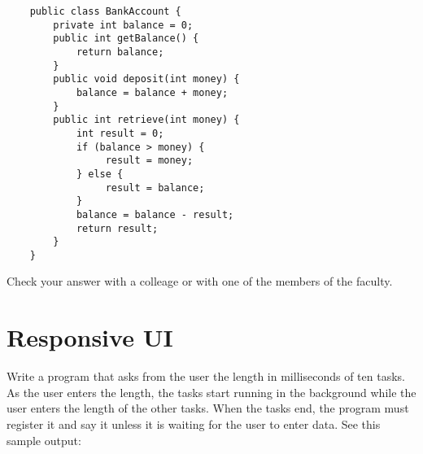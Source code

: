 \documentclass{article}
\begin{document}
\begin{verbatim}
    public class BankAccount {
        private int balance = 0;
        public int getBalance() {
            return balance;
        }
        public void deposit(int money) {
            balance = balance + money;
        }
        public int retrieve(int money) {
            int result = 0;
            if (balance > money) {
                 result = money;
            } else {
                 result = balance;
            }
            balance = balance - result;
            return result;
        }
    }
\end{verbatim}

Check your answer with a colleage or with one of the members of the
faculty. 




\section{Responsive UI}
\label{sec:responsive-ui}

Write a program that asks from the user the length in milliseconds of
ten tasks. As the user enters the length, the tasks start running in
the background while the user enters the length of the other
tasks. When the tasks end, the program must register it and say it
unless it is waiting for the user to enter data. See this sample
output: 
\end{document}

